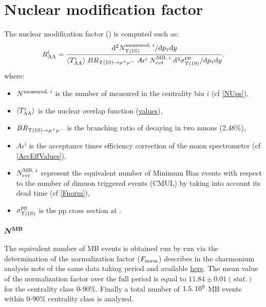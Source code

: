 \graphicspath{{Figures/RAA/}}


\section{\label{RAA}Nuclear modification factor}

The \ups nuclear modification factor (\Raa) is computed such as:
\begin{align*}
R^{i}_{\rm{AA}}=\frac{{\rm d}^{2}N^{{\rm measured},\;i}_{\Upsilon\mathrm{(1S)}}/{\rm d}p_{\mathrm{\textsc{t}}}{\rm d}y}{\langle T^{i}_{\rm AA}\rangle\;BR_{\Upsilon\mathrm{(1S)}\to\mu^{+}\mu^{-}}\;A\epsilon^{i}\;N^{{\rm MB},\;i}_{evt}\;{\rm d}^{2}\sigma^{\rm{pp}}_{\Upsilon\mathrm{(1S)}}/{\rm d}p_{\mathrm{\textsc{t}}}{\rm d}y}.
\end{align*}
where:
\begin{itemize}
\item $N^{{\rm measured},\;i}$ is the number of \ups measured in the centrality bin $i$ (cf \ref{NUps}),
\item $\langle T^{i}_{\rm AA}\rangle$ is the nuclear overlap function (\href{https://twiki.cern.ch/twiki/bin/view/ALICE/CentralityCodeSnippets#Anchor_Point}{values}),
\item $BR_{\Upsilon\mathrm{(1S)}\to\mu^{+}\mu^{-}}$ is the branching ratio of \ups decaying in two muons (2.48\%),
\item $A\epsilon^{i}$ is the acceptance times efficiency correction of the muon spectrometer (cf \ref{AccEffValues}),
\item $N^{{\rm MB},\;i}_{evt}$  represent the equivalent number of Minimum Bias events with respect to the number of dimuon triggered events (CMUL) by taking into account its dead time (cf \ref{Fnorm}),
\item $\sigma^{\rm{pp}}_{\Upsilon\mathrm{(1S)}}$ is the \ups pp cross section at \sqrtSE[5.02][TeV].
\end{itemize}


\paragraph{\label{Fnorm}$\boldsymbol{N^{{\rm MB}}}$}
The equivalent number of MB events is obtained run by run via the determination of the normalization factor ($F_{\rm norm}$) describes in the charmonium analysis note of the same data taking period and available \href{https://aliceinfo.cern.ch/Notes/node/486}{here}.
The mean value of the normalization factor over the full period is equal to $11.84 \pm 0.01(stat.)$ for the centrality class 0-90\%.
Finally a total number of $1.5\ldotp10^9$ MB events within 0-90\% centrality class is analyzed.


